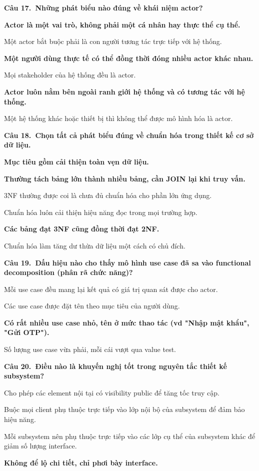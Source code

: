 \documentclass[11pt,a4paper]{article}
\newcommand{\cau}[2]{\par\vspace{2pt}\noindent\textbf{Câu #1.\ #2}\par\vspace{1pt}}
\newenvironment{pa}
  {\begin{list}{}{\leftmargin=0.95cm\labelwidth=0.5cm\labelsep=0.3cm
     \itemsep=0pt\parsep=0pt\topsep=0pt\partopsep=0pt}}
  {\end{list}}
\newcommand{\A}{\item[A.]}
\newcommand{\B}{\item[B.]}
\newcommand{\C}{\item[C.]}
\newcommand{\D}{\item[D.]}
\newcommand{\E}{\item[E.]}
\newcommand{\F}{\item[F.]}
\begin{document}
\cau{17}{Những phát biểu nào đúng về khái niệm actor?}
\begin{pa}
  \A {\bfseries Actor là một vai trò, không phải một cá nhân hay thực thể cụ thể.}
  \B Một actor bắt buộc phải là con người tương tác trực tiếp với hệ thống.
  \C {\bfseries Một người dùng thực tế có thể đồng thời đóng nhiều actor khác nhau.}
  \D Mọi stakeholder của hệ thống đều là actor.
  \E {\bfseries Actor luôn nằm bên ngoài ranh giới hệ thống và có tương tác với hệ thống.}
  \F Một hệ thống khác hoặc thiết bị thì không thể được mô hình hóa là actor.
\end{pa}

\cau{18}{Chọn \textbf{tất cả} phát biểu đúng về chuẩn hóa trong thiết kế cơ sở dữ liệu.}
\begin{pa}
  \A {\bfseries Mục tiêu gồm cải thiện toàn vẹn dữ liệu.}
  \B {\bfseries Thường tách bảng lớn thành nhiều bảng, cần JOIN lại khi truy vấn.}
  \C 3NF thường được coi là chưa đủ chuẩn hóa cho phần lớn ứng dụng.
  \D Chuẩn hóa luôn cải thiện hiệu năng đọc trong mọi trường hợp.
  \E {\bfseries Các bảng đạt 3NF cũng đồng thời đạt 2NF.}
  \F Chuẩn hóa làm tăng dư thừa dữ liệu một cách có chủ đích.
\end{pa}

\cau{19}{Dấu hiệu nào cho thấy mô hình use case đã sa vào functional decomposition (phân rã chức năng)?}
\begin{pa}
  \A Mỗi use case đều mang lại kết quả có giá trị quan sát được cho actor.
  \B Các use case được đặt tên theo mục tiêu của người dùng.
  \C {\bfseries Có rất nhiều use case nhỏ, tên ở mức thao tác (vd "Nhập mật khẩu", "Gửi OTP").}
  \D Số lượng use case vừa phải, mỗi cái vượt qua value test.
\end{pa}

\cau{20}{Điều nào là khuyến nghị tốt trong nguyên tắc thiết kế subsystem?}
\begin{pa}
  \A Cho phép các element nội tại có visibility public để tăng tốc truy cập.
  \B Buộc mọi client phụ thuộc trực tiếp vào lớp nội bộ của subsystem để đảm bảo hiệu năng.
  \C Mỗi subsystem nên phụ thuộc trực tiếp vào các lớp cụ thể của subsystem khác để giảm số lượng interface.
  \D {\bfseries Không để lộ chi tiết, chỉ phơi bày interface.}
\end{pa}
\end{document}

